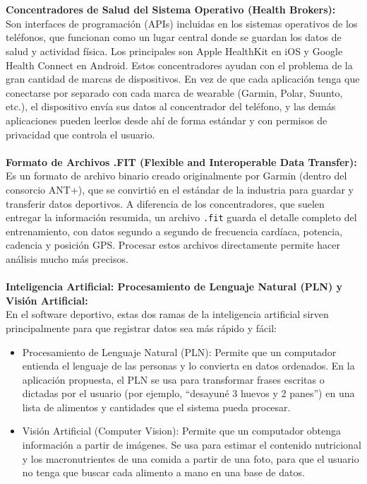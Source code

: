 \\\\
\textbf{Concentradores de Salud del Sistema Operativo (Health Brokers):}\\
Son interfaces de programación (APIs) incluidas en los sistemas operativos de los teléfonos, que funcionan como un lugar central donde se guardan los datos de salud y actividad física. Los principales son Apple HealthKit en iOS y Google Health Connect en Android. Estos concentradores ayudan con el problema de la gran cantidad de marcas de dispositivos. En vez de que cada aplicación tenga que conectarse por separado con cada marca de wearable (Garmin, Polar, Suunto, etc.), el dispositivo envía sus datos al concentrador del teléfono, y las demás aplicaciones pueden leerlos desde ahí de forma estándar y con permisos de privacidad que controla el usuario.
\\\\
\textbf{Formato de Archivos .FIT (Flexible and Interoperable Data Transfer):}\\
Es un formato de archivo binario creado originalmente por Garmin (dentro del consorcio ANT+), que se convirtió en el estándar de la industria para guardar y transferir datos deportivos. A diferencia de los concentradores, que suelen entregar la información resumida, un archivo \texttt{.fit} guarda el detalle completo del entrenamiento, con datos segundo a segundo de frecuencia cardíaca, potencia, cadencia y posición GPS. Procesar estos archivos directamente permite hacer análisis mucho más precisos.
\\\\
\textbf{Inteligencia Artificial: Procesamiento de Lenguaje Natural (PLN) y Visión Artificial:}\\
En el software deportivo, estas dos ramas de la inteligencia artificial sirven principalmente para que registrar datos sea más rápido y fácil:
\begin{itemize}
    \item Procesamiento de Lenguaje Natural (PLN): Permite que un computador entienda el lenguaje de las personas y lo convierta en datos ordenados. En la aplicación propuesta, el PLN se usa para transformar frases escritas o dictadas por el usuario (por ejemplo, ``desayuné 3 huevos y 2 panes'') en una lista de alimentos y cantidades que el sistema pueda procesar.
    \item Visión Artificial (Computer Vision): Permite que un computador obtenga información a partir de imágenes. Se usa para estimar el contenido nutricional y los macronutrientes de una comida a partir de una foto, para que el usuario no tenga que buscar cada alimento a mano en una base de datos.
\end{itemize}
